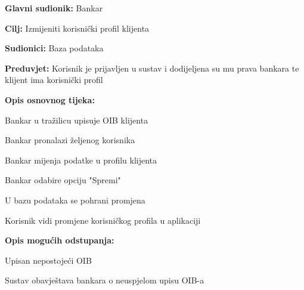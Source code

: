                 
                \noindent {}
                \begin{packed_item}
                
                  \item \textbf{Glavni sudionik: }Bankar
                  \item  \textbf{Cilj:} Izmijeniti korisnički profil klijenta 
                  \item  \textbf{Sudionici:} Baza podataka
                  \item  \textbf{Preduvjet:} Korisnik je prijavljen u sustav i dodijeljena su mu prava bankara te klijent ima korisnički profil
                  \item  \textbf{Opis osnovnog tijeka:}
                  
                  \item[] \begin{packed_enum}
                
                    \item  Bankar u tražilicu upisuje OIB klijenta
                    \item  Bankar pronalazi željenog korisnika
                    \item  Bankar mijenja podatke u profilu klijenta
                    \item  Bankar odabire opciju "Spremi"
                    \item  U bazu podataka se pohrani promjena                     
                    \item  Korisnik vidi promjene korisničkog profila u aplikaciji 
                  \end{packed_enum}
                  
                  \item  \textbf{Opis mogućih odstupanja:}
                  
                  \item[] \begin{packed_item}
                  	
                  	 \item[1.a] Upisan nepostojeći OIB
                  	\item[] \begin{packed_enum}
                  		
                  		\item Sustav obavještava bankara o neuspjelom upisu OIB-a 
                  		

\end{packed_enum}
\end{packed_item}
\end{packed_item}
